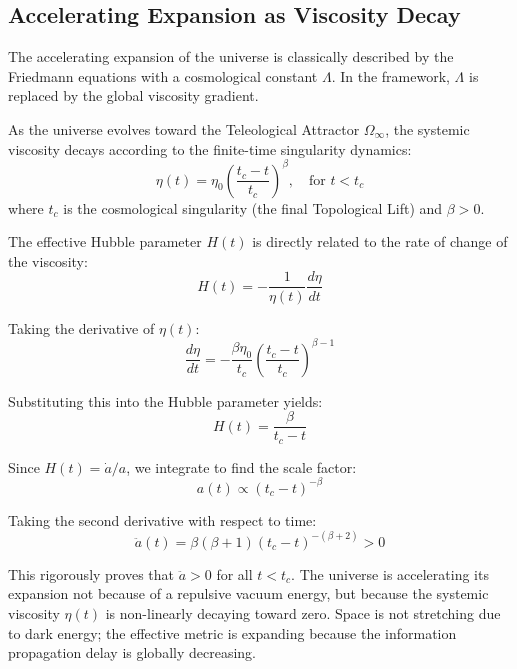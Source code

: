 \documentclass[12pt,twoside]{extbook}
\theoremstyle{definition}
\theoremstyle{remark}
\begin{document}
\subsection{Accelerating Expansion as Viscosity Decay}
The accelerating expansion of the universe is classically described by the Friedmann equations with a cosmological constant $\Lambda$. In the framework, $\Lambda$ is replaced by the global viscosity gradient. 

As the universe evolves toward the Teleological Attractor $\Omega_\infty$, the systemic viscosity decays according to the finite-time singularity dynamics:
\begin{equation}
\eta(t) = \eta_0 \left( \frac{t_c - t}{t_c} \right)^\beta, \quad \text{for } t < t_c
\end{equation}
where $t_c$ is the cosmological singularity (the final Topological Lift) and $\beta > 0$.

The effective Hubble parameter $H(t)$ is directly related to the rate of change of the viscosity:
\begin{equation}
H(t) = -\frac{1}{\eta(t)} \frac{d\eta}{dt}
\end{equation}

Taking the derivative of $\eta(t)$:
\begin{equation}
\frac{d\eta}{dt} = -\frac{\beta \eta_0}{t_c} \left( \frac{t_c - t}{t_c} \right)^{\beta - 1}
\end{equation}

Substituting this into the Hubble parameter yields:
\begin{equation}
H(t) = \frac{\beta}{t_c - t}
\end{equation}

Since $H(t) = \dot{a}/a$, we integrate to find the scale factor:
\begin{equation}
a(t) \propto (t_c - t)^{-\beta}
\end{equation}

Taking the second derivative with respect to time:
\begin{equation}
\ddot{a}(t) = \beta(\beta + 1)(t_c - t)^{-(\beta + 2)} > 0
\end{equation}

This rigorously proves that $\ddot{a} > 0$ for all $t < t_c$. The universe is accelerating its expansion not because of a repulsive vacuum energy, but because the systemic viscosity $\eta(t)$ is non-linearly decaying toward zero. Space is not stretching due to dark energy; the effective metric is expanding because the information propagation delay is globally decreasing.
\end{document}
